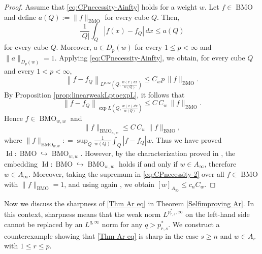 \documentclass[reqno, 10pt, oneside]{amsart}
\numberwithin{equation}{section}
\numberwithin{theorem}{section}
\newcommand{\1}{{\rm 1\hspace*{-0.4ex}%
\rule{0.1ex}{1.52ex}\hspace*{0.2ex}}}
\newcommand{\ed}{\color{black}}
\begin{document}
\begin{proof}
	Assume that \eqref{eq:CPnecessity-Ainfty} holds for a weight $w$. Let $f\in \operatorname{BMO}$ and define $a(Q):=\|f\|_{\operatorname{BMO}}$ for every cube $Q$. Then,
	\begin{equation*}
		\frac{1}{|Q|}\int_Q |f(x)-f_Q|\,dx \le a(Q)
	\end{equation*}
	for every cube $Q$. Moreover, $a\in D_p(w)$ for every $1\le p<\infty$ and $\|a\|_{D_p(w)}= 1$. Applying \eqref{eq:CPnecessity-Ainfty}, we obtain, for every cube $Q$ and every $1<p<\infty$,
	\begin{equation*}
		\left\| f-f_Q\right\|_{ L^{p,\infty}\left(Q,\frac{w(x)\,dx}{w(Q)}\right)}
		\le C_w p\, \|f\|_{\operatorname{BMO}}.
	\end{equation*}
	By Proposition \ref{prop:linearweakLptoexpL}, it follows that
	\begin{equation*}
		\left\| f-f_Q\right\|_{\exp L\left(Q,\frac{w(x)\,dx}{w(Q)}\right)}
		\le C\,C_w\,\|f\|_{\operatorname{BMO}}.
	\end{equation*}
	  Hence $f\in \operatorname{BMO}_{w,w}$ and
	\begin{equation}\label{eq:CPnecessity-2}
		\|f\|_{\operatorname{BMO}_{w,w}}\le C\,C_w\,\|f\|_{\operatorname{BMO}},
	\end{equation}
    where $\|f\|_{\operatorname{BMO}_{w,w}} : = \sup_Q \frac{1}{w(Q)}\int_Q |f-f_Q| w$. Thus we have proved $\operatorname{Id}: \operatorname{BMO} \hookrightarrow \operatorname{BMO}_{w,w}$. However, by the characterization proved in \cite[Theorem 1.2]{OPRR}, the embedding $\operatorname{Id}: \operatorname{BMO} \hookrightarrow \operatorname{BMO}_{w,w}$ holds if and only if $w\in A_\infty$, therefore $w\in A_\infty$. Moreover, taking the supremum in \eqref{eq:CPnecessity-2} over all $f\in \operatorname{BMO}$ with $\|f\|_{\operatorname{BMO}}= 1$, and using again \cite[Theorem 1.2]{OPRR}, we obtain $[w]_{A_\infty}\le c_n C_w$.
\end{proof}
\ed


Now we discuss the sharpness of \eqref{Thm Ar eq} in Theorem {\ref{Selfimproving Ar}}.  In this context, sharpness means that the weak norm $L^{p_{r,s}^{*},\infty}$ on the left-hand side cannot be replaced by an $L^{q,\infty}$ norm for any $q > p_{r,s}^{*}$.   We construct a counterexample showing that  \eqref{Thm Ar eq} is sharp in the case $s\ge n$ and $w\in A_r$ with $1\le r\le p$.
\end{document}
